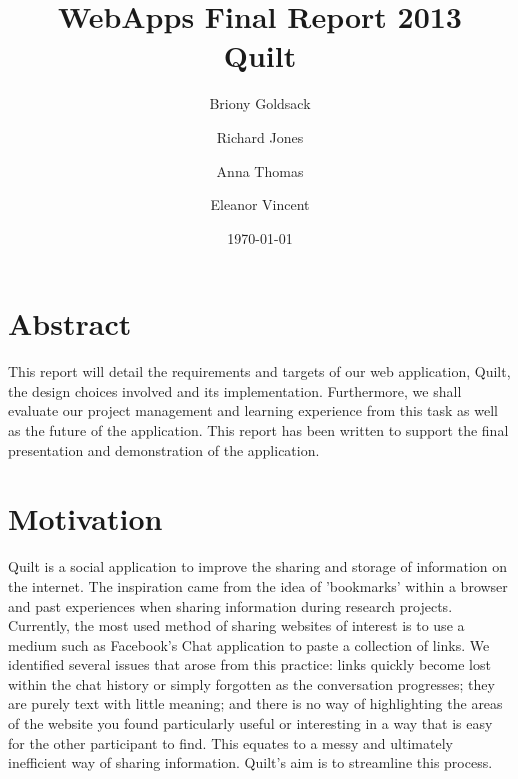 \documentclass[a4wide, 10pt]{article}
\begin{document}
\title{WebApps Final Report 2013 \\
       Quilt}
\author{Briony Goldsack \and Richard Jones \and Anna Thomas \and Eleanor Vincent}
\date{\today}         
\maketitle            

\section{Abstract}

This report will detail the requirements and targets of our web application, Quilt, the design choices involved and its implementation. Furthermore, we shall evaluate our project management and learning experience from this task as well as the future of the application. This report has been written to support the final presentation and demonstration of the application.

\section{Motivation} 
Quilt is a social application to improve the sharing and storage of information on the internet. The inspiration came from the idea of 'bookmarks' within a browser and past experiences when sharing information during research projects. Currently, the most used method of sharing websites of interest is to use a medium such as Facebook's Chat application to paste a collection of links. We identified several issues that arose from this practice: links quickly become lost within the chat history or simply forgotten as the conversation progresses; they are purely text with little meaning; and there is no way of highlighting the areas of the website you found particularly useful or interesting in a way that is easy for the other participant to find. This equates to a messy and ultimately inefficient way of sharing information. Quilt's aim is to streamline this process. 
\end{document}
